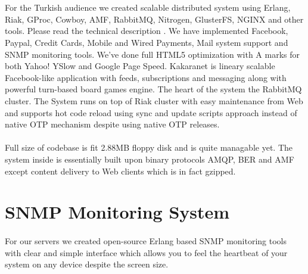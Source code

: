 \documentclass[11pt]{article}
\begin{document}
\section*{}
\paragraph{}
    For the Turkish audience we created scalable distributed system using Erlang, Riak,
    GProc, Cowboy, AMF, RabbitMQ, Nitrogen, GlusterFS, NGINX and other tools. 
    Please read the technical description
    .
    We have implemented Facebook, Paypal, Credit Cards, Mobile and Wired Payments,
    Mail system support and SNMP monitoring tools. We've done full HTML5 optimization
    with A marks for both Yahoo! YSlow and Google Page Speed. Kakaranet is lineary scalable
    Facebook-like application with feeds, subscriptions and messaging along with
    powerful turn-based board games engine. The heart of the system the RabbitMQ
    cluster. The System runs on top of Riak cluster with easy maintenance from Web
    and supports hot code reload using sync and update scripts approach 
    instead of native OTP mechanism despite using native OTP releases. 



\paragraph{}
    Full size of codebase is fit 2.88MB floppy disk and is quite managable yet.
    The system inside is essentially built upon binary protocols AMQP, BER and AMF
    except content delivery to Web clients which is in fact gzipped.



\section*{SNMP Monitoring System}
\paragraph{}
    For our servers we created open-source Erlang based SNMP monitoring tools
    with clear and simple interface which allows you to feel the heartbeat of
    your system on any device despite the screen size.
\end{document}
